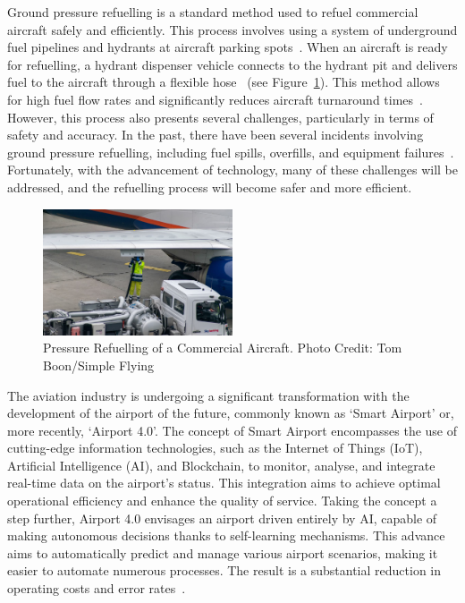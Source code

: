 \documentclass[12pt,oneside]{book} %
\begin{document}
Ground pressure refuelling is a standard method used to refuel commercial
aircraft safely and efficiently. This process involves using a system of
underground fuel pipelines and hydrants at aircraft parking
spots~\cite{blakey2011aviation}. When an aircraft is ready for refuelling, a
hydrant dispenser vehicle connects to the hydrant pit and delivers fuel to the
aircraft through a flexible hose~\cite{sati2019aircraft, Cummins2020} (see
Figure~\ref{fig:pressure-refuelling}). This method allows for high fuel flow
rates and significantly reduces aircraft turnaround
times~\cite{blakey2011aviation}. However, this process also presents several
challenges, particularly in terms of safety and accuracy. In the past, there
have been several incidents involving ground pressure refuelling, including
fuel spills, overfills, and equipment
failures~\cite{doi:10.1080/13669877.2013.879493, CostsOfUnsafetyAviation}.
Fortunately, with the advancement of technology, many of these challenges will
be addressed, and the refuelling process will become safer and more efficient. 

\begin{figure}[H]
    \centering
    \includegraphics[width=0.5\textwidth]{figures/pressure-refuelling.jpeg}
    \caption{Pressure Refuelling of a Commercial Aircraft. Photo Credit: Tom Boon/Simple Flying~\cite{ImageRefueling}}\label{fig:pressure-refuelling}
\end{figure}

The aviation industry is undergoing a significant transformation with the
development of the airport of the future, commonly known as `Smart Airport’ or,
more recently, `Airport 4.0’. The concept of Smart Airport encompasses the use
of cutting-edge information technologies, such as the Internet of Things (IoT),
Artificial Intelligence (AI), and Blockchain, to monitor, analyse, and
integrate real-time data on the airport's status. This integration aims to
achieve optimal operational efficiency and enhance the quality of service.
Taking the concept a step further, Airport 4.0 envisages an airport driven
entirely by AI, capable of making autonomous decisions thanks to self-learning
mechanisms. This advance aims to automatically predict and manage various
airport scenarios, making it easier to automate numerous processes. The result
is a substantial reduction in operating costs and error
rates~\cite{10.1007/978-981-16-5943-0_26}.
\end{document}
